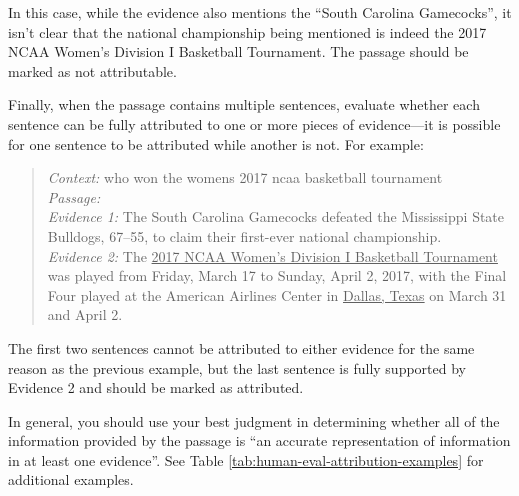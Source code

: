 In this case, while the evidence also mentions the ``South Carolina Gamecocks'', it isn't clear that the national championship being mentioned is indeed the 2017 NCAA Women's Division I Basketball Tournament. The passage should be marked as not attributable.

Finally, when the passage contains multiple sentences, evaluate whether each sentence can be fully attributed to one or more pieces of evidence—it is possible for one sentence to be attributed while another is not. For example:

\begin{quote}
\textit{Context:}
who won the womens 2017 ncaa basketball tournament \\
\textit{Passage:}
   \\
\textit{Evidence 1:}
The South Carolina Gamecocks defeated the Mississippi State Bulldogs, 67–55, to claim their first-ever national championship. \\
\textit{Evidence 2:}
The \ul{2017 NCAA Women's Division I Basketball Tournament} was played from Friday, March 17 to Sunday, April 2, 2017, with the Final Four played at the American Airlines Center in \ul{Dallas, Texas} on March 31 and April 2.
\end{quote}

The first two sentences cannot be attributed to either evidence for the same reason as the previous example, but the last sentence is fully supported by Evidence 2 and should be marked as attributed.

In general, you should use your best judgment in determining whether all of the information provided by the passage is ``an accurate representation of information in at least one evidence''. See Table \ref{tab:human-eval-attribution-examples} for additional examples.

